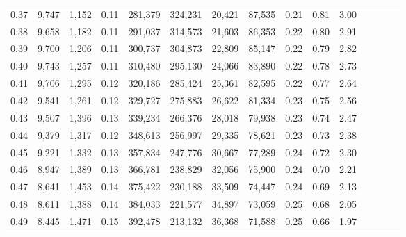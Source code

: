 \begin{tabular}{rrrcrrrrrrrrrrr}
0.37 &   9,747 &  1,152 &                                       0.11 &  281,379 &  324,231 &   20,421 &   87,535 &  0.21 &  0.81 &                         3.00 \\
0.38 &   9,658 &  1,182 &                                       0.11 &  291,037 &  314,573 &   21,603 &   86,353 &  0.22 &  0.80 &                         2.91 \\
0.39 &   9,700 &  1,206 &                                       0.11 &  300,737 &  304,873 &   22,809 &   85,147 &  0.22 &  0.79 &                         2.82 \\
0.40 &   9,743 &  1,257 &                                       0.11 &  310,480 &  295,130 &   24,066 &   83,890 &  0.22 &  0.78 &                         2.73 \\
0.41 &   9,706 &  1,295 &                                       0.12 &  320,186 &  285,424 &   25,361 &   82,595 &  0.22 &  0.77 &                         2.64 \\
0.42 &   9,541 &  1,261 &                                       0.12 &  329,727 &  275,883 &   26,622 &   81,334 &  0.23 &  0.75 &                         2.56 \\
0.43 &   9,507 &  1,396 &                                       0.13 &  339,234 &  266,376 &   28,018 &   79,938 &  0.23 &  0.74 &                         2.47 \\
0.44 &   9,379 &  1,317 &                                       0.12 &  348,613 &  256,997 &   29,335 &   78,621 &  0.23 &  0.73 &                         2.38 \\
0.45 &   9,221 &  1,332 &                                       0.13 &  357,834 &  247,776 &   30,667 &   77,289 &  0.24 &  0.72 &                         2.30 \\
0.46 &   8,947 &  1,389 &                                       0.13 &  366,781 &  238,829 &   32,056 &   75,900 &  0.24 &  0.70 &                         2.21 \\
0.47 &   8,641 &  1,453 &                                       0.14 &  375,422 &  230,188 &   33,509 &   74,447 &  0.24 &  0.69 &                         2.13 \\
0.48 &   8,611 &  1,388 &                                       0.14 &  384,033 &  221,577 &   34,897 &   73,059 &  0.25 &  0.68 &                         2.05 \\
0.49 &   8,445 &  1,471 &                                       0.15 &  392,478 &  213,132 &   36,368 &   71,588 &  0.25 &  0.66 &                         1.97 \\

\end{tabular}
